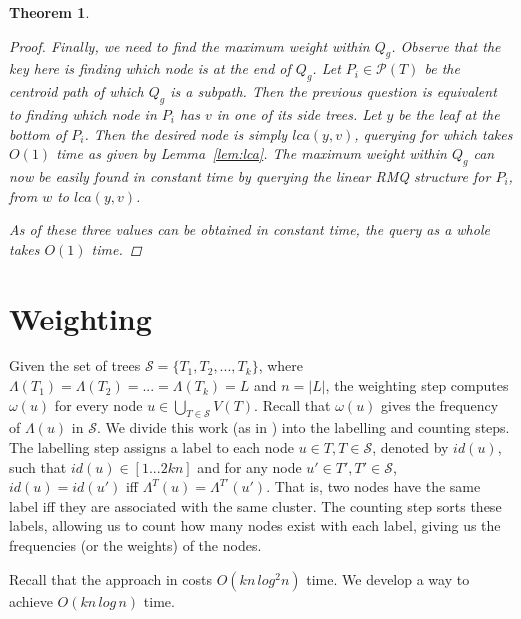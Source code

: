 \documentclass{article}
\newcommand{\leafset}{\Lambda}
\newcommand{\weight}{\omega}
\newtheorem{rmqquery}[incompatibility]{Theorem}
\begin{document}
\begin{rmqquery}
\begin{proof}
            Finally, we need to find the maximum weight within $Q_g$. Observe that the key here is finding which node is at the end of $Q_g$. Let $P_i \in \mathcal{P}(T)$ be the centroid path of which $Q_g$ is a subpath. Then the previous question is equivalent to finding which node in $P_i$ has $v$ in one of its side trees. Let $y$ be the leaf at the bottom of $P_i$. Then the desired node is simply $lca(y, v)$, querying for which takes $O(1)$ time as given by Lemma~\ref{lem:lca}. The maximum weight within $Q_g$ can now be easily found in constant time by querying the linear RMQ structure for $P_i$, from $w$ to $lca(y, v)$.

            As of these three values can be obtained in constant time, the query as a whole takes $O(1)$ time.
        \end{proof}
    \end{rmqquery}

    \section{Weighting}
    \label{sec:weighting}

    Given the set of trees $\mathcal{S} = \{T_1, T_2, ..., T_k\}$, where $\leafset(T_1) = \leafset(T_2) = ... = \leafset(T_k) = L$ and $n = |L|$, the weighting step computes $\weight(u)$ for every node $u \in \bigcup_{T \in \mathcal{S}}V(T)$. Recall that $\weight(u)$ gives the frequency of $\leafset(u)$ in $\mathcal{S}$. We divide this work (as in \cite{gawrychowski2017faster}) into the labelling and counting steps. The labelling step assigns a label to each node $u \in T, T \in \mathcal{S}$, denoted by $id(u)$, such that $id(u) \in [1 ... 2kn]$ and for any node $u' \in T', T' \in \mathcal{S}$, $id(u) = id(u')$ iff $\leafset^T(u) = \leafset^{T'}(u')$. That is, two nodes have the same label iff they are associated with the same cluster. The counting step sorts these labels, allowing us to count how many nodes exist with each label, giving us the frequencies (or the weights) of the nodes.

    Recall that the approach in \cite{gawrychowski2017faster} costs $O(kn\,log^2n)$ time. We develop a way to achieve $O(kn\,log\,n)$ time.
\end{document}
